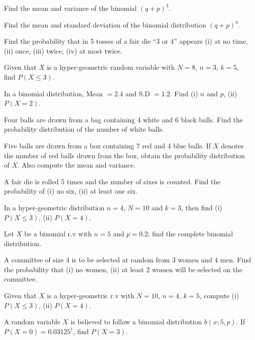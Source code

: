 \documentclass[11pt,a4paper]{article}
\begin{document}
\begin{longlist}
\item Find the mean and variance of the binomial $(q+p)^3$.

\item Find the mean and standard deviation of the binomial distribution $(q+p)^n$.

\item Find the probability that in 5 tosses of a fair die ``3 or 4'' appears (i) at no time, (ii) once, (iii) twice, (iv) at most twice.

\item Given that $X$ is a hyper-geometric random variable with $N=8$, $n=3$, $k=5$, find $P(X\leq 3)$.

\item In a binomial distribution, Mean $=2.4$ and S.D $=1.2$. Find (i) $n$ and $p$, (ii) $P(X=2)$.

\item Four balls are drawn from a bag containing 4 white and 6 black balls. Find the probability distribution of the number of white balls.

\item Five balls are drawn from a box containing 7 red and 4 blue balls. If $X$ denotes the number of red balls drawn from the box, obtain the probability distribution of $X$. Also compute the mean and variance.

\item A fair die is rolled 5 times and the number of sixes is counted. Find the probability of (i) no six, (ii) at least one six.

\item In a hyper-geometric distribution $n=4$, $N=10$ and $k=3$, then find (i) $P(X\leq 3)$, (ii) $P(X=4)$.

\item Let $X$ be a binomial r.v with $n=5$ and $p=0.2$; find the complete binomial distribution.

\item A committee of size 4 is to be selected at random from 3 women and 4 men. Find the probability that (i) no women, (ii) at least 2 women will be selected on the committee.

\item Given that $X$ is a hyper-geometric r.v with $N=10$, $n=4$, $k=5$, compute (i) $P(X\leq 3)$, (ii) $P(X=4)$.

\item A random variable $X$ is believed to follow a binomial distribution $b(x;5,p)$. If $P(X=0)=0.03125^\dagger$, find $P(X=3)$.


\end{longlist}
\end{document}
